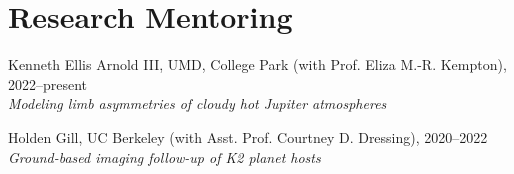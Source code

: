 \documentclass[letterpaper,10.5pt]{article}
\newcommand{\resumeSubHeadingListStart}{\begin{itemize}[leftmargin=*]}
\newcommand{\shorterSection}[1]{\vspace{-10pt}\section{#1}}
\begin{document}
  
  
  





\shorterSection{Research Mentoring}
\small
  \begin{list}{}{\cvlist}  
  \item[{\color{numcolor}}]Kenneth Ellis Arnold III, UMD, College Park (with Prof. Eliza M.-R. Kempton), 2022--present \\
  \textit{Modeling limb asymmetries of cloudy hot Jupiter atmospheres}
  \item[{\color{numcolor}}]Holden Gill, UC Berkeley (with Asst. Prof. Courtney D. Dressing), 2020--2022 \\
    \textit{Ground-based imaging follow-up of K2 planet hosts}


  \end{list}
\end{document}
